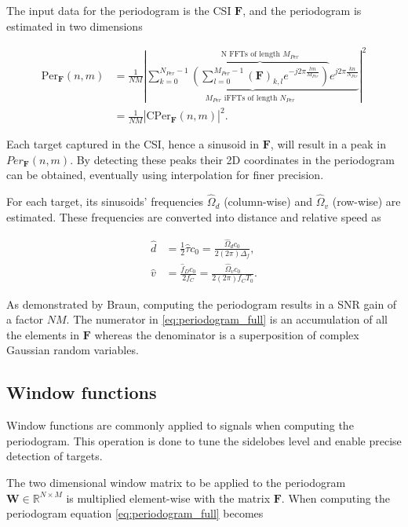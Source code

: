     The input data for the periodogram is the CSI $\bm{F}$, and the periodogram is estimated in two dimensions

    \begin{align}
        \text{Per}_{\bm{F}}(n,m) &= \frac{1}{NM} \left| \underbrace{ \sum_{k=0}^{N_{Per}-1}  \overbrace{\left(  \sum_{l=0}^{M_{Per}-1} (\bm{F})_{k,l} e^{-j2\pi \frac{lm}{M_{Per}}} \right)}^{\text{N FFTs of length $M_{Per}$}}  e^{j2\pi\frac{kn}{N_{Per}}}}_{ \text{$M_{Per}$ iFFTs of length $N_{Per}$ }} \right| ^ 2 \label{eq:periodogram_full}\\
        &= \frac{1}{NM} \left| \text{CPer}_{\bm{F}}(n,m) \right| ^ 2. \label{eq:periodogram_cper}
    \end{align}


    Each target captured in the CSI, hence a sinusoid in $\bm{F}$, will result in a peak in $Per_{\bm{F}}(n,m)$. By detecting these peaks their 2D coordinates in the periodogram can be obtained, eventually using interpolation for finer precision.

    For each target, its sinusoids' frequencies $\hat{\Omega}_d$ (column-wise) and $\hat{\Omega}_v$ (row-wise) are estimated.
    These frequencies are converted into distance and relative speed as

    \begin{align}
        \hat{d} &= \frac{1}{2}\hat{\tau}c_0 = \frac{\hat{\Omega}_d c_0}{2 (2\pi) \Delta_f}, \\
        \hat{v} &= \frac{\hat{f}_D c_0 }{2 f_C} = \frac{\hat{\Omega}_v c_0}{2(2\pi)f_CT_0}.
    \end{align}

    As demonstrated by Braun, computing the periodogram results in a SNR gain of a factor $NM$. The numerator in \ref{eq:periodogram_full} is an accumulation of all the elements in $\bm{F}$ whereas the denominator is a superposition of complex Gaussian random variables.
    
	\subsection{Window functions}
	
	Window functions are commonly applied to signals when computing the periodogram. This operation is done to tune the sidelobes level and enable precise detection of targets. 
	
	
	The two dimensional window matrix to be applied to the periodogram $\bm{W} \in \mathbb{R}^{N\times M}$ is multiplied element-wise with the matrix $\bm{F}$. When computing the periodogram equation \ref{eq:periodogram_full} becomes
	
